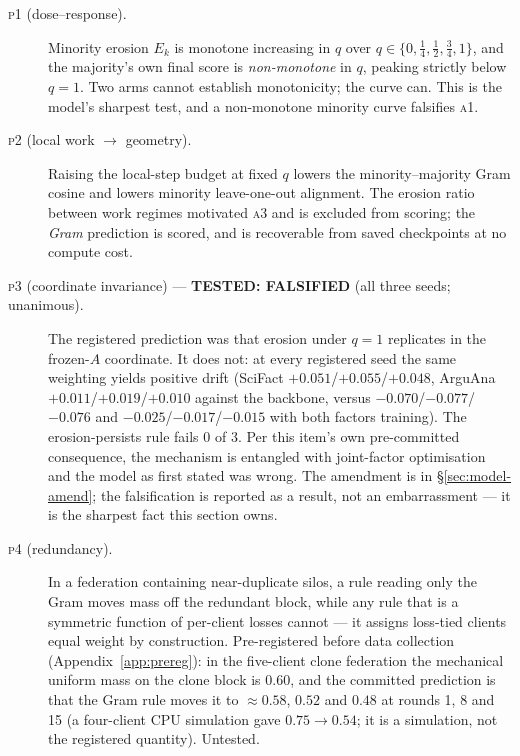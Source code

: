 \begin{description}
\item[\textsc{p1} (dose--response).] Minority erosion $E_k$ is monotone
increasing in $q$ over $q\in\{0,\tfrac14,\tfrac12,\tfrac34,1\}$, and the
majority's own final score is \emph{non-monotone} in $q$, peaking strictly below
$q=1$. Two arms cannot establish monotonicity; the curve can. This is the
model's sharpest test, and a non-monotone minority curve falsifies \textsc{a1}.

\item[\textsc{p2} (local work $\to$ geometry).] Raising the local-step budget at
fixed $q$ lowers the minority--majority Gram cosine and lowers minority
leave-one-out alignment. The erosion ratio between work regimes motivated
\textsc{a3} and is excluded from scoring; the \emph{Gram} prediction is scored,
and is recoverable from saved checkpoints at no compute cost.

\item[\textsc{p3} (coordinate invariance) --- \textbf{TESTED: FALSIFIED}
(all three seeds; unanimous).] The registered prediction was that erosion
under $q{=}1$ replicates in the frozen-$A$ coordinate. It does not: at every
registered seed the same weighting yields positive drift (SciFact
$+0.051$/$+0.055$/$+0.048$, ArguAna $+0.011$/$+0.019$/$+0.010$ against the
backbone, versus $-0.070$/$-0.077$/$-0.076$ and $-0.025$/$-0.017$/$-0.015$
with both factors training). The erosion-persists rule fails 0 of 3. Per this item's own
pre-committed consequence, the mechanism is entangled with joint-factor
optimisation and the model as first stated was wrong. The amendment is in
\S\ref{sec:model-amend}; the falsification is reported as a result, not an
embarrassment --- it is the sharpest fact this section owns.

\item[\textsc{p4} (redundancy).] In a federation containing near-duplicate
silos, a rule reading only the Gram moves mass off the redundant block, while
any rule that is a symmetric function of per-client losses cannot --- it assigns
loss-tied clients equal weight by construction. Pre-registered before data
collection (Appendix~\ref{app:prereg}): in the five-client clone federation the
mechanical uniform mass on the clone block is $0.60$, and the committed
prediction is that the Gram rule moves it to $\approx0.58$, $0.52$ and $0.48$ at
rounds 1, 8 and 15 (a four-client CPU simulation gave $0.75\to0.54$; it is a
simulation, not the registered quantity). Untested.


\end{description}
